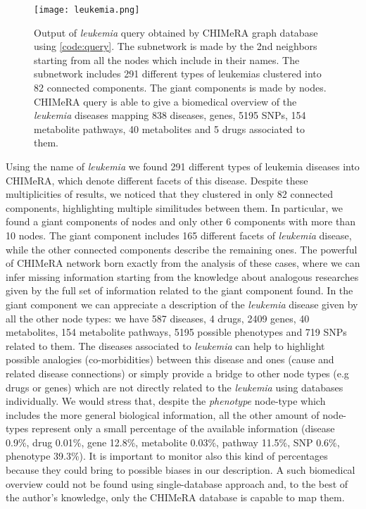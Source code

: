 \documentclass{standalone}
\begin{document}
\begin{figure}[htbp]
\centering
\texttt{[image: leukemia.png]}
\caption{Output of \emph{leukemia} query obtained by \textsf{CHIMeRA} graph database using \ref{code:query}.
The subnetwork is made by the 2nd neighbors starting from all the nodes which include  in their names.
The subnetwork includes 291 different types of leukemias clustered into 82 connected components.
The giant components is made by  nodes.
\textsf{CHIMeRA} query is able to give a biomedical overview of the \emph{leukemia} diseases mapping 838 diseases,  genes, 5195 SNPs, 154 metabolite pathways, 40 metabolites and 5 drugs associated to them.
}
\label{fig:leukemia}
\end{figure}

Using the  name of \emph{leukemia} we found 291 different types of leukemia diseases into \textsf{CHIMeRA}, which denote different facets of this disease.
Despite these multiplicities of results, we noticed that they clustered in only 82 connected components, highlighting multiple similitudes between them.
In particular, we found a giant components of  nodes and only other 6 components with more than 10 nodes.
The giant component includes 165 different facets of \emph{leukemia} disease, while the other connected components describe the remaining ones.
The powerful of \textsf{CHIMeRA} network born exactly from the analysis of these cases, where we can infer missing information starting from the knowledge about analogous researches given by the full set of information related to the giant component found.
In the giant component we can appreciate a description of the \emph{leukemia} disease given by all the other node types: we have 587 diseases, 4 drugs, 2409 genes, 40 metabolites, 154 metabolite pathways, 5195 possible phenotypes and 719 SNPs related to them.
The diseases associated to \emph{leukemia} can help to highlight possible analogies (co-morbidities) between this  disease and  ones (cause and related disease connections) or simply provide a bridge to other node types (e.g drugs or genes) which are not directly related to the \emph{leukemia} using databases individually.
We would stress that, despite the \emph{phenotype} node-type which includes the more general biological information, all the other amount of node-types represent only a small percentage of the available information (disease 0.9\%, drug 0.01\%, gene 12.8\%, metabolite 0.03\%, pathway 11.5\%, SNP 0.6\%, phenotype 39.3\%).
It is important to monitor also this kind of percentages because they could bring to possible biases in our description.
A such biomedical overview could not be found using single-database approach and, to the best of the author's knowledge, only the \textsf{CHIMeRA} database is capable to map them.
\end{document}
